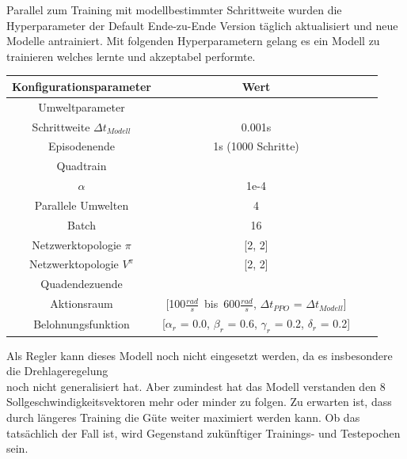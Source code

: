 Parallel zum Training mit modellbestimmter Schrittweite wurden die Hyperparameter der Default Ende-zu-Ende Version täglich aktualisiert und neue Modelle antrainiert. Mit folgenden Hyperparametern gelang es ein Modell zu trainieren welches lernte und akzeptabel performte.
\vspace*{0.5cm}
\begin{center}
\begin{tabular}[h]{|c|c|c|c|}
\hline 
Konfigurationsparameter & Wert \\
\hline 
Umweltparameter & \\
Schrittweite $\Delta t_{Modell}$ & 0.001s \\
Episodenende & 1s (1000 Schritte)\\
\hline
Quadtrain & \\
$\alpha$ & 1e-4\\
Parallele Umwelten & 4\\
Batch & 16\\
Netzwerktopologie $\pi$ & [2, 2]\\
Netzwerktopologie $V^{\pi}$ & [2, 2]\\
\hline
Quadendezuende & \\
Aktionsraum & [100$\frac{rad}{s}$\ bis\ 600$\frac{rad}{s}$, $\Delta t_{PPO}$ = $\Delta t_{Modell}$]\\
Belohnungsfunktion & [$\alpha_r$ = 0.0, $\beta_r$ = 0.6, $\gamma_r$ = 0.2, $\delta_r$ = 0.2]\\
\hline
\end{tabular}
\end{center}
\vspace*{0.5cm}
Als Regler kann dieses Modell noch nicht eingesetzt werden, da es insbesondere die Drehlageregelung\\ noch nicht generalisiert hat. Aber zumindest hat das Modell verstanden den 8 Sollgeschwindigkeitsvektoren mehr oder minder zu folgen. Zu erwarten ist, dass durch längeres Training die Güte weiter maximiert werden kann. Ob das tatsächlich der Fall ist, wird Gegenstand zukünftiger Trainings- und Testepochen sein.
